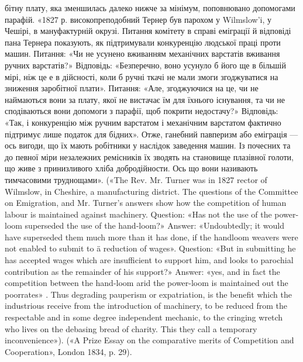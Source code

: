 бітну плату, яка зменшилась далеко нижче за мінімум, поповнювано
допомогами парафій. «1827 р. високопреподобний Тернер був парохом у
Wilmslow’i, у Чешірі, в мануфактурній окрузі. Питання комітету в справі
еміграції й відповіді пана Тернера показують, як підтримували конкуренцію
людської праці проти машин. Питання: «Чи не усунено вживанням
механічних варстатів вживання ручних варстатів?» Відповідь: «Безперечно,
воно усунуло б його ще в більшій мірі, ніж це е в дійсності, коли б
ручні ткачі не мали змоги згоджуватися на зниження заробітної плати».
Питання: «Але, згоджуючися на це, чи не наймаються вони за плату,
якої не вистачає їм для їхнього існування, та чи не сподіваються вони
допомоги з парафії, щоб покрити недостачу?» Відповідь: «Так, і конкуренцію
між ручним варстатом і механічним варстатом фактично підтримує
лише податок для бідних». Отже, ганебний павперизм або еміграція — ось
вигоди, що їх мають робітники у наслідок заведення машин. Із почесних
та до певної міри незалежних ремісників їх зводять на становище плазівної
голоти, що живе з принизливого хліба добродійности. Ось що
вони називають тимчасовими труднощами». («The Rev. Mr. Turner was
in 1827 rector of Wilmslow, in Cheshire, a manufacturing district. The questions
of the Committee on Emigration, and Mr. Turner’s answers show
how the competition of human labour is maintained against machinery.
Question: «Has not the use of the power-loom superseded the use of the
hand-loom?» Answer: «Undoubtedly; it would have superseded them much
more than it has done, if the handloom weavers were not enabled to submit
to ä reduction of wages». Question: «But in submitting he has accepted wages
which are insufficient to support him, and looks to parochial contribution
as the remainder of his support?» Answer: «yes, and in fact the competition
between the hand-loom arid the power-loom is maintained out the poorrates»
. Thus degrading pauperism or expatriation, is the benefit which the
industrious receive from the introduction of machinery, to be reduced from
the respectable and in some degree independent mechanic, to the cringing
wretch who lives on the debasing bread of charity. This they call a temporary
inconvenience»). («A Prize Essay on the comparative merits of Competition
and Cooperation», London 1834, p. 29).